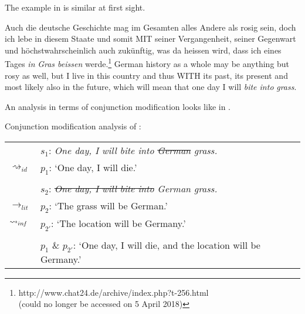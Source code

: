 \documentclass[output=paper]{langsci/langscibook}
\begin{document}
The example in  is similar at first sight.

\ea \label{German grass}
Auch die deutsche Geschichte mag im Gesamten alles Andere als rosig sein, doch ich lebe in diesem Staate und somit MIT seiner Vergangenheit, seiner Gegenwart und höchstwahrscheinlich auch zukünftig, was da heissen wird, dass ich eines Tages \textit{in} \underline{} \textit{Gras beissen} werde.\footnote{http://www.chat24.de/archive/index.php?t-256.html \\
(could no longer be accessed on 5 April 2018)}
\vspace{5pt}
\glt German history as a whole may be anything but rosy as well, but I live in this country and thus WITH its past, its present and most likely also in the future, which will mean that one day I will \textit{bite into} \underline{} \textit{grass}.
\z

\noindent An analysis in terms of conjunction modification looks like in .

\ea \label{analysis1 German grass} 
Conjunction modification analysis of : \\
\vspace{5pt}
\begin{tabular}{ll}
								& 	$s_{1}$: \hspace{4pt} \textit{One day, I will bite into \sout{German} grass.} \\
$\rightsquigarrow_{id}$				&	$p_{1}$: \hspace{1pt} `One day, I will die.' \\
\vspace{-5pt} \\
								& 	$s_{2}$: \hspace{4pt} \textit{\sout{One day, I will bite into} German grass.} \\
$\rightarrow_{lit}$					&	$p_{2}$: \hspace{1pt} `The grass will be German.' \\
$\rightsquigarrow_{in\hspace{-0.8pt} f}$	&	$p_{2'}$: \hspace{-1.5pt} `The location will be Germany.' \\
\vspace{-5pt} \\
								&	$p_{1}$ \& $p_{2'}$: `One day, I will die, and the location will be Germany.' 
\end{tabular}
\z
\end{document}
